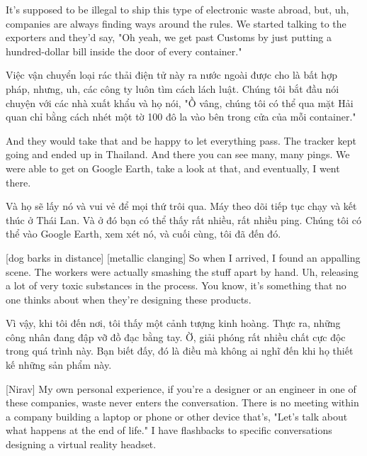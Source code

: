 \documentclass[a4paper]{article}
\begin{document}
	It's supposed to be illegal to ship this type of electronic waste abroad, but, uh, companies are always finding ways around the rules.
	We started talking to the exporters and they'd say, "Oh yeah, we get past Customs by just putting a hundred-dollar bill inside the door of every container."
	
	\begin{vietnamese-v2}
		Việc vận chuyển loại rác thải điện tử này ra nước ngoài được cho là bất hợp pháp, nhưng, uh, các công ty luôn tìm cách lách luật.
		Chúng tôi bắt đầu nói chuyện với các nhà xuất khẩu và họ nói, "Ồ vâng, chúng tôi có thể qua mặt Hải quan chỉ bằng cách nhét một tờ 100 đô la vào bên trong cửa của mỗi container."
	\end{vietnamese-v2}
	
	And they would take that and be happy to let everything pass.
	The tracker kept going and ended up in Thailand.
	And there you can see many, many pings.
	We were able to get on Google Earth, take a look at that, and eventually, I went there.
	
	\begin{vietnamese-v2}
		Và họ sẽ lấy nó và vui vẻ để mọi thứ trôi qua.
		Máy theo dõi tiếp tục chạy và kết thúc ở Thái Lan.
		Và ở đó bạn có thể thấy rất nhiều, rất nhiều ping.
		Chúng tôi có thể vào Google Earth, xem xét nó, và cuối cùng, tôi đã đến đó.
	\end{vietnamese-v2}
	
	[dog barks in distance]
	[metallic clanging]
	So when I arrived, I found an appalling scene.
	The workers were actually smashing the stuff apart by hand.
	Uh, releasing a lot of very toxic substances in the process.
	You know, it's something that no one thinks about when they're designing these products.
	
	\begin{vietnamese-v2}
		Vì vậy, khi tôi đến nơi, tôi thấy một cảnh tượng kinh hoàng.
		Thực ra, những công nhân đang đập vỡ đồ đạc bằng tay.
		Ờ, giải phóng rất nhiều chất cực độc trong quá trình này.
		Bạn biết đấy, đó là điều mà không ai nghĩ đến khi họ thiết kế những sản phẩm này.
	\end{vietnamese-v2}
	
	[Nirav] My own personal experience, if you're a designer or an engineer in one of these companies, waste never enters the conversation.
	There is no meeting within a company building a laptop or phone or other device that's, "Let's talk about what happens at the end of life."
	I have flashbacks to specific conversations designing a virtual reality headset.
	
\end{document}
